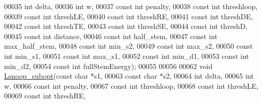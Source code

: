 \begin{DoxyCode}
00035                      \textcolor{keywordtype}{int}        delta,
00036                      \textcolor{keywordtype}{int}        w,
00037                      \textcolor{keyword}{const} \textcolor{keywordtype}{int}  penalty,
00038                      \textcolor{keyword}{const} \textcolor{keywordtype}{int}  threshloop,
00039                      \textcolor{keyword}{const} \textcolor{keywordtype}{int}  threshLE,
00040                      \textcolor{keyword}{const} \textcolor{keywordtype}{int}  threshRE,
00041                      \textcolor{keyword}{const} \textcolor{keywordtype}{int}  threshDE,
00042                      \textcolor{keyword}{const} \textcolor{keywordtype}{int}  threshTE,
00043                      \textcolor{keyword}{const} \textcolor{keywordtype}{int}  threshSE,
00044                      \textcolor{keyword}{const} \textcolor{keywordtype}{int}  threshD,
00045                      \textcolor{keyword}{const} \textcolor{keywordtype}{int}  distance,
00046                      \textcolor{keyword}{const} \textcolor{keywordtype}{int}  half\_stem,
00047                      \textcolor{keyword}{const} \textcolor{keywordtype}{int}  max\_half\_stem,
00048                      \textcolor{keyword}{const} \textcolor{keywordtype}{int}  min\_s2,
00049                      \textcolor{keyword}{const} \textcolor{keywordtype}{int}  max\_s2,
00050                      \textcolor{keyword}{const} \textcolor{keywordtype}{int}  min\_s1,
00051                      \textcolor{keyword}{const} \textcolor{keywordtype}{int}  max\_s1,
00052                      \textcolor{keyword}{const} \textcolor{keywordtype}{int}  min\_d1,
00053                      \textcolor{keyword}{const} \textcolor{keywordtype}{int}  min\_d2,
00054                      \textcolor{keyword}{const} \textcolor{keywordtype}{int}  fullStemEnergy);
00055 
00056 
00062 \textcolor{keywordtype}{void} \mbox{\hyperlink{snoop_8h_a60fee9c0b7df8f44c862030c6553ffa7}{Lsnoop\_subopt}}(\textcolor{keyword}{const} \textcolor{keywordtype}{char} *s1,
00063                    \textcolor{keyword}{const} \textcolor{keywordtype}{char} *s2,
00064                    \textcolor{keywordtype}{int}        delta,
00065                    \textcolor{keywordtype}{int}        w,
00066                    \textcolor{keyword}{const} \textcolor{keywordtype}{int}  penalty,
00067                    \textcolor{keyword}{const} \textcolor{keywordtype}{int}  threshloop,
00068                    \textcolor{keyword}{const} \textcolor{keywordtype}{int}  threshLE,
00069                    \textcolor{keyword}{const} \textcolor{keywordtype}{int}  threshRE,

\end{DoxyCode}
